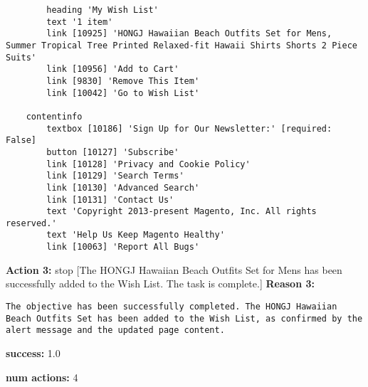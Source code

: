 \begin{tcolorbox}[breakable]
\begin{lstlisting}
        heading 'My Wish List'
        text '1 item'
        link [10925] 'HONGJ Hawaiian Beach Outfits Set for Mens, Summer Tropical Tree Printed Relaxed-fit Hawaii Shirts Shorts 2 Piece Suits'
        link [10956] 'Add to Cart'
        link [9830] 'Remove This Item'
        link [10042] 'Go to Wish List'

    contentinfo
        textbox [10186] 'Sign Up for Our Newsletter:' [required: False]
        button [10127] 'Subscribe'
        link [10128] 'Privacy and Cookie Policy'
        link [10129] 'Search Terms'
        link [10130] 'Advanced Search'
        link [10131] 'Contact Us'
        text 'Copyright 2013-present Magento, Inc. All rights reserved.'
        text 'Help Us Keep Magento Healthy'
        link [10063] 'Report All Bugs'
\end{lstlisting}
\textbf{Action 3:} stop [The HONGJ Hawaiian Beach Outfits Set for Mens has been successfully added to the Wish List. The task is complete.]
\textbf{Reason 3:} 
\begin{lstlisting}
The objective has been successfully completed. The HONGJ Hawaiian Beach Outfits Set has been added to the Wish List, as confirmed by the alert message and the updated page content.
\end{lstlisting}
\textbf{success:}
1.0

\textbf{num actions:}
4
\end{tcolorbox}

